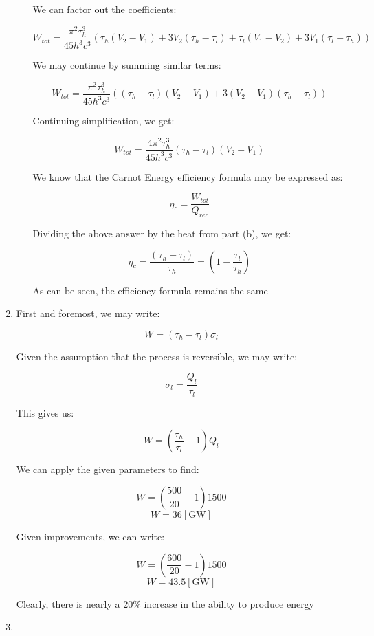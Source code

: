 \begin{enumerate}
\begin{enumerate}
        We can factor out the coefficients:

        $$W_{tot}=\frac{\pi^2\tau_h^3}{45h^3c^3}\left(\tau_h(V_2-V_1)+3V_2(\tau_h-\tau_l)+\tau_l(V_1-V_2)+3V_1(\tau_l-\tau_h)\right)$$

        We may continue by summing similar terms:

        $$W_{tot}=\frac{\pi^2\tau_h^3}{45h^3c^3}\left((\tau_h-\tau_l)(V_2-V_1)+3(V_2-V_1)(\tau_h-\tau_l)\right)$$

        Continuing simplification, we get:

        $$\boxed{W_{tot}=\frac{4\pi^2\tau_h^3}{45h^3c^3}(\tau_h-\tau_l)(V_2-V_1)}$$

        We know that the Carnot Energy efficiency formula may be expressed as:

        $$\eta_c=\frac{W_{tot}}{Q_{rec}}$$

        Dividing the above answer by the heat from part (b), we get:

        $$\boxed{\eta_c=\frac{(\tau_h-\tau_l)}{\tau_h}=\left( 1-\frac{\tau_l}{\tau_h} \right)}$$

        As can be seen, the efficiency formula remains the same
        
    \end{enumerate}

    \setcounter{enumi}{4}

  \item

    First and foremost, we may write:

    $$W=(\tau_h-\tau_l)\sigma_l$$

    Given the assumption that the process is reversible, we may write:

    $$\sigma_l=\frac{Q_l}{\tau_l}$$

    This gives us:

    $$W=\left( \frac{\tau_h}{\tau_l}-1 \right)Q_l$$

    We can apply the given parameters to find:

    $$W=\left( \frac{500}{20}-1 \right)1500$$
    $$\boxed{W=36[\si{\giga\watt}]}$$

    Given improvements, we can write:

    $$W=\left( \frac{600}{20}-1 \right)1500$$
    $$\boxed{W=43.5[\si{\giga\watt}]}$$

    Clearly, there is nearly a 20\% increase in the ability to produce energy

  \item


\end{enumerate}
